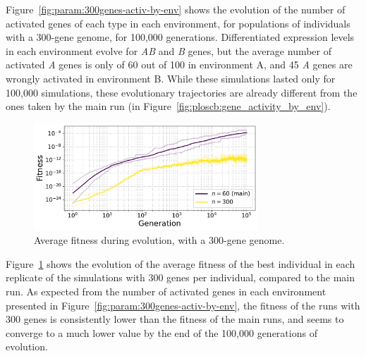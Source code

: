 Figure~\ref{fig:param:300genes-activ-by-env} shows the evolution of the number of activated genes of each type in each environment, for populations of individuals with a 300-gene genome, for 100,000 generations.
Differentiated expression levels in each environment evolve for \emph{AB} and \emph{B} genes, but the average number of activated \emph{A} genes is only of 60 out of 100 in environment A, and 45 \emph{A} genes are wrongly activated in environment B.
While these simulations lasted only for 100,000 simulations, these evolutionary trajectories are already different from the ones taken by the main run (in Figure~\ref{fig:ploscb:gene_activity_by_env}).

\begin{figure}[H]
\centering
\includegraphics[width=0.75\textwidth]{param/300-genes/fitness_all_with_main.pdf}
\caption[Average fitness during evolution, with a 300-gene genome]{Average fitness during evolution, with a 300-gene genome.}
\label{fig:param:300gene-fitness}
\end{figure}

Figure~\ref{fig:param:300gene-fitness} shows the evolution of the average fitness of the best individual in each replicate of the simulations with 300 genes per individual, compared to the main run.
As expected from the number of activated genes in each environment presented in Figure~\ref{fig:param:300genes-activ-by-env}, the fitness of the runs with 300 genes is consistently lower than the fitness of the main runs, and seems to converge to a much lower value by the end of the 100,000 generations of evolution.

